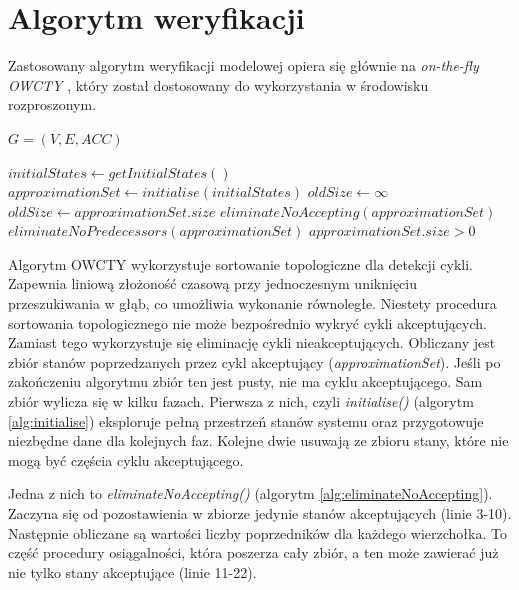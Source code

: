 \chapter{Algorytm weryfikacji}

Zastosowany algorytm weryfikacji modelowej opiera się głównie na \textit{on-the-fly OWCTY} \cite{Bar12}, który został dostosowany do wykorzystania w środowisku rozproszonym.

\begin{algorithm}
\caption{$ detectAcceptingCycle() $}
\label{alg:detectAcceptingCycle}
\begin{algorithmic}[1]
\REQUIRE $ G = (V,E,ACC) $

\STATE $ initialStates \leftarrow getInitialStates() $
\STATE $ approximationSet \leftarrow initialise(initialStates) $
\STATE $ oldSize \leftarrow \infty $
  \STATE $ oldSize \leftarrow approximationSet.size $
  \STATE $ eliminateNoAccepting(approximationSet) $
  \STATE $ eliminateNoPredecessors(approximationSet) $
\ENDWHILE
\RETURN $ approximationSet.size > 0 $
\end{algorithmic}
\end{algorithm}

Algorytm OWCTY wykorzystuje sortowanie topologiczne dla detekcji cykli.
Zapewnia liniową złożoność czasową przy jednoczesnym uniknięciu przeszukiwania w głąb, co umożliwia wykonanie równoległe.
Niestety procedura sortowania topologicznego nie może bezpośrednio wykryć cykli akceptujących.
Zamiast tego wykorzystuje się eliminację cykli nieakceptujących.
Obliczany jest zbiór stanów poprzedzanych przez cykl akceptujący (\textit{approximationSet}).
Jeśli po zakończeniu algorytmu zbiór ten jest pusty, nie ma cyklu akceptującego.
Sam zbiór wylicza się w kilku fazach.
Pierwsza z nich, czyli \textit{initialise()} (algorytm \ref{alg:initialise}) eksploruje pełną przestrzeń stanów systemu oraz przygotowuje niezbędne dane dla kolejnych faz.
Kolejne dwie usuwają ze zbioru stany, które nie mogą być częścia cyklu akceptującego.

Jedna z nich to \textit{eliminateNoAccepting()} (algorytm \ref{alg:eliminateNoAccepting}).
Zaczyna się od pozostawienia w zbiorze jedynie stanów akceptujących (linie 3-10).
Następnie obliczane są wartości liczby poprzedników dla każdego wierzchołka.
To część procedury osiągalności, która poszerza cały zbiór, a ten może zawierać już nie tylko stany akceptujące (linie 11-22).

